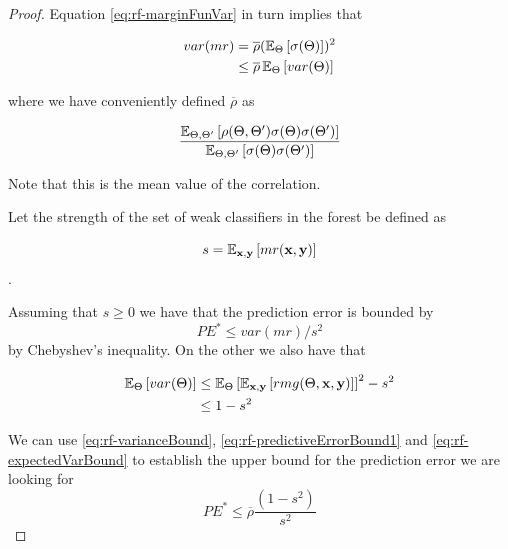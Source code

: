 \begin{proof}
Equation \ref{eq:rf-marginFunVar} in turn implies that

\begin{equation}\label{eq:rf-varianceBound}
\begin{split}
var(mr) & =  \overline{\rho} (\operatorname{\mathbb{E}}_{\Theta}\left[ \sigma(\Theta)\right] )^2 \\
& \leq  \overline{\rho} \operatorname{\mathbb{E}}_{\Theta} \left[ var(\Theta) \right]
\end{split}
\end{equation}

where we have conveniently defined $\overline{\rho}$ as

\begin{equation}\label{eq:rf-meanCorrelation}
\frac{\operatorname{\mathbb{E}}_{\Theta, \Theta'} \left[ \rho(\Theta, \Theta') \sigma(\Theta) \sigma(\Theta')\right]}
{\operatorname{\mathbb{E}}_{\Theta, \Theta'} \left[ \sigma(\Theta) \sigma(\Theta')\right]}
\end{equation}

Note that this is the mean value of the correlation.

Let the strength of the set of weak classifiers in the forest be defined as

$$s =  \operatorname{\mathbb{E}}_{\textbf{x},\textbf{y}} \left[ mr(\textbf{x},\textbf{y} ) \right] $$.\label{eq:rf-strength}

Assuming that $s \geq 0$ we have that the prediction error is bounded by
\begin{equation}\label{eq:rf-predictiveErrorBound1}
PE^* \leq var(mr)/s^2
\end{equation}
by Chebyshev's inequality. On the other we also have that


\begin{equation}\label{eq:rf-expectedVarBound}
\begin{split}
\operatorname{\mathbb{E}}_{\Theta} \left[ var(\Theta) \right]  & \leq \operatorname{\mathbb{E}}_{\Theta} \left[ \operatorname{\mathbb{E}}_{\textbf{x},\textbf{y}}\left[ rmg(\Theta,\textbf{x},\textbf{y})   \right]  \right]^2 -s^2  \\
& \leq 1-s^2
\end{split}
\end{equation}


We can use  \ref{eq:rf-varianceBound}, \ref{eq:rf-predictiveErrorBound1} and \ref{eq:rf-expectedVarBound} to establish the upper bound for the prediction error we are looking for
\begin{equation}\label{eq:rf-PEBound}
PE^* \leq \overline{\rho}\frac{(1-s^2)}{s^2}
\end{equation}
\end{proof}

